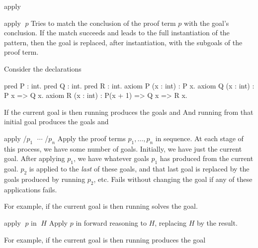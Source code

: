 \begin{tactic}{apply}
  \begin{tsyntax}{apply $\;p$}
    Tries to match the conclusion of the proof term $p$ with the
    goal's conclusion. If the match succeeds and leads to the full
    instantiation of the pattern, then the goal is replaced, after
    instantiation, with the subgoals of the proof term.

    Consider the declarations
\begin{easycrypt}{}{}
pred P : int.
pred Q : int.
pred R : int.
axiom P (x : int) : P x.
axiom Q (x : int) : P x => Q x.
axiom R (x : int) : P(x + 1) => Q x => R x.
\end{easycrypt}
    If the current goal is
     then
    running 
    produces the goals
    and
    And running
    from that initial goal
    produces the goals
    and
  \end{tsyntax}

  \begin{tsyntax}{apply /$p_1$ $\;\cdots$ /$p_n$}
    Apply the proof terms $p_1,\ldots,p_n$ in sequence. At each stage
    of this process, we have some number of goals. Initially, we have
    just the current goal. After applying $p_1$, we have whatever
    goals $p_1$ has produced from the current goal. $p_2$ is applied
    to the \emph{last} of these goals, and that last goal is replaced
    by the goals produced by running $p_2$, etc.  Fails without
    changing the goal if any of these applications fails.

    For example, if the current goal is
     then
    running 
    solves the goal.
  \end{tsyntax}

  \begin{tsyntax}{apply $\;p$ in $\;H$}
    Apply $p$ in forward reasoning to $H$, replacing $H$ by the result.

    For example, if the current goal is
     then
    running 
    produces the goal
  \end{tsyntax}
\end{tactic}
